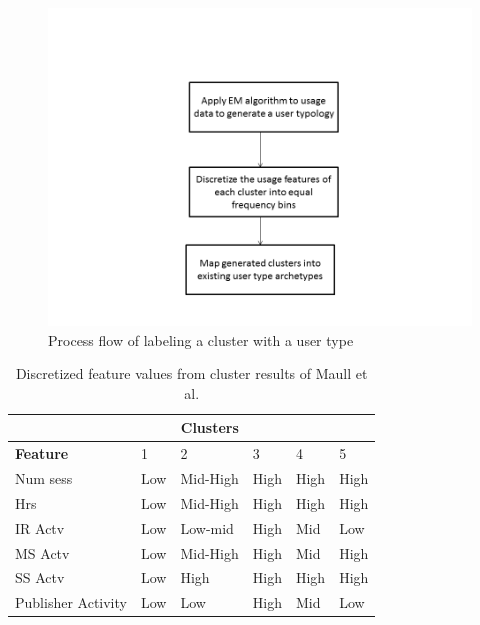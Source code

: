 \documentclass{acm_proc_article-sp}
\begin{document}
\begin{figure}
\centering
\includegraphics[width=1 \linewidth]{./process_flow}
\caption{Process flow of labeling a cluster with a user type}
\label{fig:process_flow}
\end{figure}

\begin{table}
\caption{Discretized feature values from cluster results of Maull et al. \cite{maullunderstanding}}
\label{maull_features}
\begin{tabular}{|l|l|l|l|l|l|} \\ \hline
& \multicolumn{2}{r}{\textbf{Clusters}}  \\ \hline
\textbf{Feature} & 1 & 2 & 3 & 4 & 5 \\ \hline
Num sess & Low & Mid-High & High & High & High \\ \hline
Hrs & Low & Mid-High & High & High & High \\ \hline
IR Actv & Low & Low-mid & High & Mid & Low \\ \hline
MS Actv & Low & Mid-High & High & Mid & High \\ \hline
SS Actv & Low & High & High & High & High \\ \hline
Publisher Activity & Low & Low & High & Mid & Low \\ \hline
\end{tabular}
\end{table}
\end{document}
